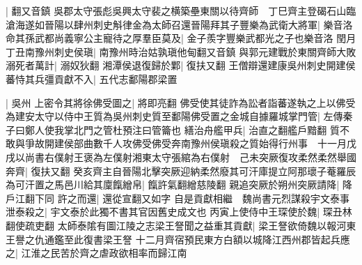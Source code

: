 |{
	翻又音鎮}
吳郡太守張彪吳興太守裴之横築壘東關以待齊師　丁巳齊主登碣石山臨滄海遂如晉陽以肆州刺史斛律金為太師召還晉陽拜其子豐樂為武衛大將軍|{
	樂音洛}
命其孫武都尚義寧公主寵待之厚羣臣莫及|{
	金子羨字豐樂武都光之子也樂音洛}
閏月丁丑南豫州刺史侯瑱|{
	南豫州時治姑孰瑱他甸翻又音鎮}
與郭元建戰於東關齊師大敗溺死者萬計|{
	溺奴狄翻}
湘潭侯退復歸於鄴|{
	復扶又翻}
王僧辯還建康吳州刺史開建侯蕃恃其兵彊貢獻不入|{
	五代志鄱陽郡梁置}


|{
	吳州}
上密令其將徐佛受圖之|{
	將即亮翻}
佛受使其徒詐為訟者詣蕃遂執之上以佛受為建安太守以侍中王質為吳州刺史質至鄱陽佛受置之金城自據羅城掌門管|{
	左傳秦子曰鄭人使我掌北門之管杜預注曰管籥也}
繕治舟艦甲兵|{
	治直之翻艦戶黯翻}
質不敢與爭故開建侯部曲數千人攻佛受佛受奔南豫州侯瑱殺之質始得行州事　十一月戊戌以尚書右僕射王褒為左僕射湘東太守張綰為右僕射　己未突厥復攻柔然柔然舉國奔齊|{
	復扶又翻}
癸亥齊主自晉陽北擊突厥迎納柔然廢其可汗庫提立阿那瓌子菴羅辰為可汗置之馬邑川給其廩餼繒帛|{
	餼許氣翻繒慈陵翻}
親追突厥於朔州突厥請降|{
	降戶江翻下同}
許之而還|{
	還從宣翻又如字}
自是貢獻相繼　魏尚書元烈謀殺宇文泰事泄泰殺之|{
	宇文泰於此獨不書其官因舊史成文也}
丙寅上使侍中王琛使於魏|{
	琛丑林翻使疏吏翻}
太師泰隂有圖江陵之志梁王詧聞之益重其貢獻|{
	梁王詧欲倚魏以報河東王譽之仇通鑑至此復書梁王詧}
十二月齊宿預民東方白額以城降江西州郡皆起兵應之|{
	江淮之民苦於齊之虐政欲相率而歸江南}


